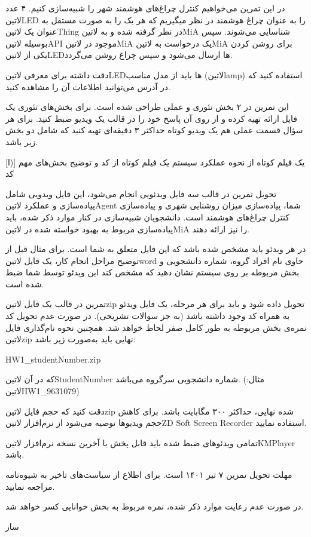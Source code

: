 \documentclass[]{assignment}
\begin{document}
در این تمرین می‌خواهیم کنترل چراغ‌های هوشمند شهر را شبیه‌سازی کنیم. ۴ عدد ‌لاتین{LED} را به عنوان چراغ هوشمند در نظر میگیریم
که هر یک را به صورت مستقل به عنوان یک ‌لاتین{Thing} در نظر گرفته شده و به ‌لاتین{MiA} شناسایی می‌شوند.
سپس بوسیله ‌لاتین{API} موجود در ‌لاتین{MiA} یک درخواست به ‌لاتین{MiA} برای روشن کردن یکی از ‌لاتین{LED}ها ارسال می‌شود
و سپس چراغ روشن می‌گردد.

دقت داشته برای معرفی ‌لاتین{LED}ها باید از مدل مناسب (‌لاتین{lamp}) استفاده کنید
که در  آدرس می‌توانید اطلاعات آن را مشاهده کنید.



 این تمرین در ۲ بخش تئوری و عملی طراحی شده است.
برای بخش‌های تئوری یک فایل ارائه تهیه کرده و از روی آن پاسخ خود را در قالب یک ویدیو ضبط کنید.
برای هر سؤال قسمت عملی هم یک ویدیو کوتاه حداکثر ۳ دقیقه‌ای تهیه کنید که شامل دو بخش زیر باشد.

[ا)]
 یک فیلم کوتاه از نحوه عملکرد سیستم
 یک فیلم کوتاه از کد و توضیح بخش‌های مهم کد

 تحویل تمرین در قالب سه فایل ویدئویی انجام می‌شود، این فایل ویدویی شامل پیاده‌سازی و عملکرد ‌لاتین{Agent} شما، پیاده‌سازی میزان روشنایی شهری
و پیاده‌سازی کنترل چراغ‌های هوشمند است.
دانشجویان شبیه‌سازی در کنار موارد ذکر شده، باید پیاده‌سازی مربوط به بهبود خواسته شده در ‌لاتین{MiA} را نیز ارائه دهند.

 در هر ویدئو باید مشخص شده باشد که این فایل متعلق به شما است. برای مثال قبل از توضیح مراحل انجام کار، یک فایل ‌لاتین{word}
حاوی نام افراد گروه، شماره دانشجویی و بخش مربوطه بر روی سیستم نشان دهید که مشخص کند این ویدئو توسط شما ضبط شده است.

 تمرین در قالب یک فایل ‌لاتین{zip} تحویل داده شود و باید برای هر مرحله، یک فایل ویدئو به همراه کد وجود داشته باشد (به جز سوالات تشریحی).
در صورت عدم تحویل کد نمره‌ی بخش مربوطه به طور کامل صفر لحاظ خواهد شد. همچنین نحوه نام‌گذاری فایل ‌لاتین{zip} نهایی باید به‌صورت زیر باشد:

HW1\_studentNumber.zip

که در آن ‌لاتین{StudentNumber} شماره دانشجویی سرگروه می‌باشد. (مثال: ‌لاتین{HW1\_9631079})

 دقت کنید که حجم فایل ‌لاتین{zip} شده نهایی، حداکثر ۳۰۰ مگابایت باشد.
برای کاهش حجم ویدیو‌ها توصیه می‌شود از نرم‌افزار ‌لاتین{ZD Soft Screen Recorder} استفاده نمایید.

 تمامی ویدئوهای ضبط شده باید قابل پخش با آخرین نسخه نرم‌افزار ‌لاتین{KMPlayer} باشد.

 مهلت تحویل تمرین ۷ تیر ۱۴۰۱ است. برای اطلاع از سیاست‌های تاخیر به شیوه‌نامه مراجعه نمایید.

 در صورت عدم رعایت موارد ذکر شده، نمره مربوط به بخش خوانایی کسر خواهد شد.


‌ساز
\end{document}

